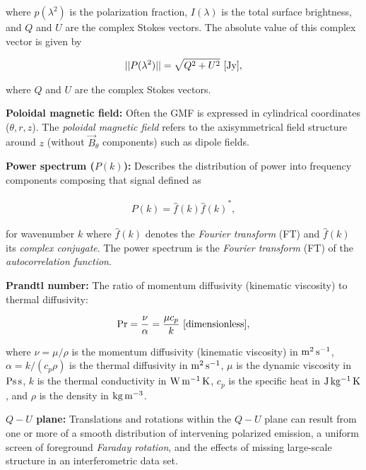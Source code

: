 \documentclass[a4paper,10pt]{article}
\begin{document}
{\noindent}where $p(\lambda^2)$ is the polarization fraction, $I(\lambda)$ is the total surface brightness, and $Q$ and $U$ are the complex Stokes vectors. The absolute value of this complex vector is given by

\begin{align*}
    \lvert\lvert P(\lambda^2) \rvert\rvert = \sqrt{Q^2 + U^2} ~ [{\rm Jy}],
\end{align*}

{\noindent}where $Q$ and $U$ are the complex Stokes vectors.

{\noindent}\textbf{Poloidal magnetic field:} Often the GMF is expressed in cylindrical coordinates ($\theta, r, z$). The \textit{poloidal magnetic field} refers to the axisymmetrical field structure around $z$ (without $\vec{B}_\theta$ components) such as dipole fields.

{\noindent}\textbf{Power spectrum ($P(k)$):} Describes the distribution of power into frequency components composing that signal defined as

\begin{align*}
    P(k) = \hat{f}(k){\hat{f}(k)}^*,
\end{align*}

{\noindent}for wavenumber $k$ where $\hat{f}(k)$ denotes the \textit{Fourier transform} (FT) and ${\hat{f}(k)}$ its \textit{complex conjugate}. The power spectrum is the \textit{Fourier transform} (FT) of the \textit{autocorrelation function}.

{\noindent}\textbf{Prandtl number:} The ratio of momentum diffusivity (kinematic viscosity) to thermal diffusivity:

\begin{align*}
    {\rm Pr} = \frac{\nu}{\alpha} = \frac{\mu c_p}{k} ~ [{\rm dimensionless}],
\end{align*}

{\noindent}where $\nu=\mu/\rho$ is the momentum diffusivity (kinematic viscosity) in ${\rm m^2\,s^{-1}}$, $\alpha=k/(c_p\rho)$ is the thermal diffusivity in ${\rm m^2\,s^{-1}}$, $\mu$ is the dynamic viscosity in ${\rm Ps\,s}$, $k$ is the thermal conductivity in ${\rm W\,m^{-1}\,K}$, $c_p$ is the specific heat in ${\rm J\,kg^{-1}\,K}$, and $\rho$ is the density in ${\rm kg\,m^{-3}}$.

{\noindent}\textbf{$Q-U$ plane:} Translations and rotations within the $Q-U$ plane can result from one or more of a smooth distribution of intervening polarized emission, a uniform screen of foreground \textit{Faraday rotation}, and the effects of missing large-scale structure in an interferometric data set.
\end{document}
